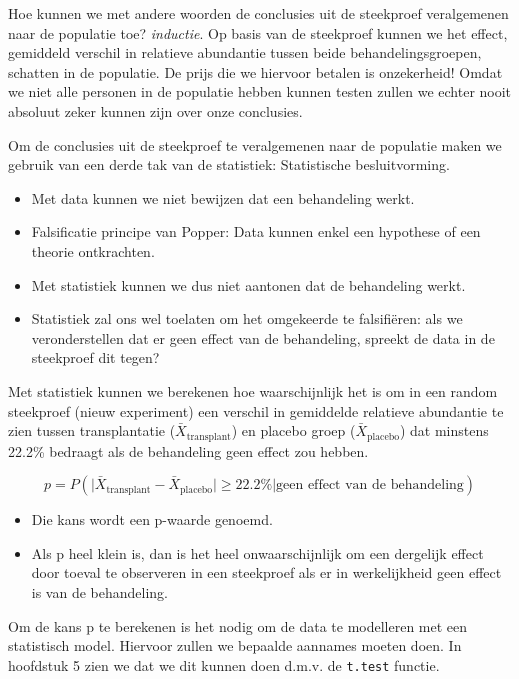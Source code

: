 \documentclass[
  12pt,dutch]{book}
\theoremstyle{definition}
\theoremstyle{definition}
\theoremstyle{definition}
\theoremstyle{definition}
\theoremstyle{remark}
\begin{document}
Hoe kunnen we met andere woorden de conclusies uit de steekproef veralgemenen naar de populatie toe? \emph{inductie}.
Op basis van de steekproef kunnen we het effect, gemiddeld verschil in relatieve abundantie tussen beide behandelingsgroepen, schatten in de populatie.
De prijs die we hiervoor betalen is onzekerheid!
Omdat we niet alle personen in de populatie hebben kunnen testen zullen we echter nooit absoluut zeker kunnen zijn over onze conclusies.

Om de conclusies uit de steekproef te veralgemenen naar de populatie maken we gebruik van een derde tak van de statistiek:
Statistische besluitvorming.

\begin{itemize}
\item
  Met data kunnen we niet bewijzen dat een behandeling werkt.
\item
  Falsificatie principe van Popper: Data kunnen enkel een hypothese of een theorie ontkrachten.
\item
  Met statistiek kunnen we dus niet aantonen dat de behandeling werkt.
\item
  Statistiek zal ons wel toelaten om het omgekeerde te falsifiëren: als we veronderstellen dat er geen effect van de behandeling, spreekt de data in de steekproef dit tegen?
\end{itemize}

Met statistiek kunnen we berekenen hoe waarschijnlijk het is om in een random steekproef (nieuw experiment) een verschil in gemiddelde relatieve abundantie te zien tussen transplantatie (\(\bar X_\text{transplant}\)) en placebo groep (\(\bar X_\text{placebo}\)) dat minstens 22.2\% bedraagt als de behandeling geen effect zou hebben.

\[p=P( \vert \bar X_\text{transplant}-\bar X_\text{placebo}\vert \geq 22.2\% \vert \text{geen effect van de behandeling})\]

\begin{itemize}
\item
  Die kans wordt een p-waarde genoemd.
\item
  Als p heel klein is, dan is het heel onwaarschijnlijk om een dergelijk effect door toeval te observeren in een steekproef als er in werkelijkheid geen effect is van de behandeling.
\end{itemize}

Om de kans p te berekenen is het nodig om de data te modelleren met een statistisch model. Hiervoor zullen we bepaalde aannames moeten doen. In hoofdstuk 5 zien we dat we dit kunnen doen d.m.v. de \texttt{t.test} functie.
\end{document}
